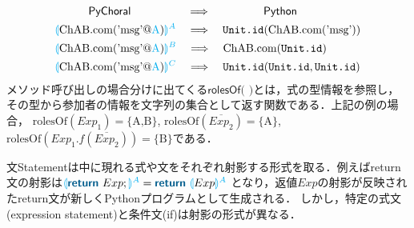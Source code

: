 \documentclass{thesis}
\newcommand{\projection}[2]{{\color{cyan}\llparenthesis}#1{\color{cyan}\rrparenthesis^#2}}
\newcommand{\mblue}[1]{\textbf{\textsf{\color{MidnightBlue}#1}}}
\newcommand{\cyan}[1]{\color{cyan}#1}
\begin{document}
\begin{alignat*}{2} 
  &~~~~~~~~~\textsf{PyChoral} ~~~~~~~~~~~~~~~\Longrightarrow~~~~~~~~~~~~~~ \textsf{Python}\\
  &\projection{\text{ChAB.com('msg'@{\cyan{A}})}}{A} ~~~\Longrightarrow~~~ \texttt{Unit.id}(\text{ChAB.com('msg')})\\
  &\projection{\text{ChAB.com('msg'@{\cyan{A}})}}{B} ~~~\Longrightarrow~~~ \text{ChAB.com(\texttt{Unit.id})}\\
  &\projection{\text{ChAB.com('msg'@{\cyan{A}})}}{C} ~~~\Longrightarrow~~~ \texttt{Unit.id}(\texttt{Unit.id},\texttt{Unit.id})
\end{alignat*}
メソッド呼び出しの場合分けに出てくる$\textsf{rolesOf(~)}$とは，式の型情報を参照し，その型から参加者の情報を文字列の集合として返す関数である．上記の例の場合，
$\text{rolesOf}(Exp_1) = \{\text{A,B}\}$, $\text{rolesOf}(\overline{Exp_2}) = \{\text{A}\}$, $\text{rolesOf}(Exp_1.f(\overline{Exp_2})) = \{\text{B}\}$である．

文Statementは中に現れる式や文をそれぞれ射影する形式を取る．例えばreturn文の射影は$\projection{\mblue{return} ~ Exp;}{A} = \mblue{return} ~ \projection{Exp}{A}$
となり，返値$Exp$の射影が反映されたreturn文が新しくPythonプログラムとして生成される．
しかし，特定の式文(expression statement)と条件文(if)は射影の形式が異なる．
\end{document}
